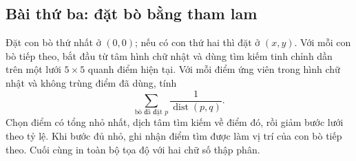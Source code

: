 \documentclass[11pt]{article}
\begin{document}
\subsection{Bài thứ ba: đặt bò bằng tham lam}

Đặt con bò thứ nhất ở \((0,0)\); nếu có con thứ hai thì đặt ở \((x,y)\). Với
mỗi con bò tiếp theo, bắt đầu từ tâm hình chữ nhật và dùng tìm kiếm tinh chỉnh
dần trên một lưới \(5\times5\) quanh điểm hiện tại. Với mỗi điểm ứng viên
trong hình chữ nhật và không trùng điểm đã dùng, tính
\[
  \sum_{\text{bò đã đặt }p}\frac{1}{\operatorname{dist}(p,q)}.
\]
Chọn điểm có tổng nhỏ nhất, dịch tâm tìm kiếm về điểm đó, rồi giảm bước lưới
theo tỷ lệ. Khi bước đủ nhỏ, ghi nhận điểm tìm được làm vị trí của con bò tiếp
theo. Cuối cùng in toàn bộ tọa độ với hai chữ số thập phân.
\end{document}
